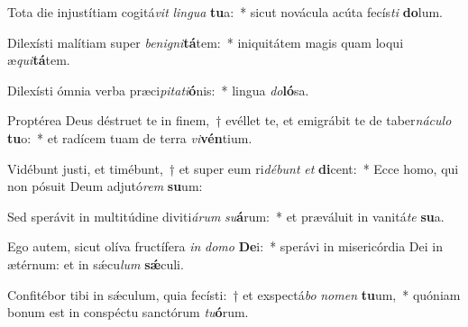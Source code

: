 \item Tota die injustítiam cogitá\textit{vit} \textit{lin}\textit{gua} \textbf{tu}a:~* sicut novácula acúta fecís\textit{ti} \textbf{do}lum.
\item Dilexísti malítiam super \textit{be}\textit{ni}\textit{gni}\textbf{tá}tem:~* iniquitátem magis quam loqui æ\textit{qui}\textbf{tá}tem.
\item Dilexísti ómnia verba præci\textit{pi}\textit{ta}\textit{ti}\textbf{ó}nis:~* lingua \textit{do}\textbf{ló}sa.
\item Proptérea Deus déstruet te in finem,~† evéllet te, et emigrábit te de taber\textit{ná}\textit{cu}\textit{lo} \textbf{tu}o:~* et radícem tuam de terra \textit{vi}\textbf{vén}tium.
\item Vidébunt justi, et timébunt,~† et super eum ri\textit{dé}\textit{bunt} \textit{et} \textbf{di}cent:~* Ecce homo, qui non pósuit Deum adjutó\textit{rem} \textbf{su}um:
\item Sed sperávit in multitúdine diviti\textit{á}\textit{rum} \textit{su}\textbf{á}rum:~* et præváluit in vanitá\textit{te} \textbf{su}a.
\item Ego autem, sicut olíva fructífera \textit{in} \textit{do}\textit{mo} \textbf{De}i:~* sperávi in misericórdia Dei in ætérnum: et in sǽcu\textit{lum} \textbf{sǽ}culi.
\item Confitébor tibi in sǽculum, quia fecísti:~† et exspectá\textit{bo} \textit{no}\textit{men} \textbf{tu}um,~* quóniam bonum est in conspéctu sanctórum \textit{tu}\textbf{ó}rum.
